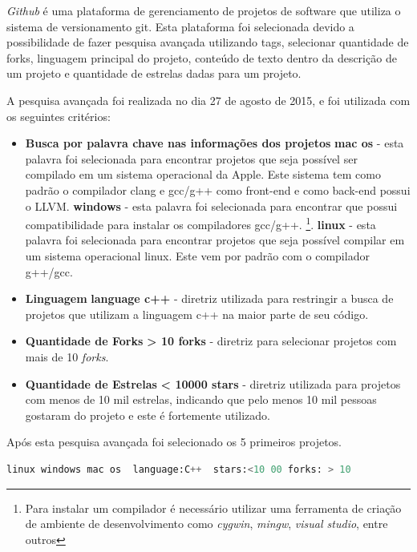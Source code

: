 \textit{Github} é uma plataforma de gerenciamento de projetos de software que
utiliza o sistema de versionamento git. Esta plataforma foi selecionada devido a
 possibilidade de fazer pesquisa avançada utilizando tags, selecionar quantidade de forks,
 linguagem principal do projeto, conteúdo de texto dentro da descrição de um projeto e
 quantidade de estrelas dadas para um projeto.


A pesquisa avançada foi realizada no dia 27 de agosto de 2015, e foi utilizada
 com os seguintes critérios:

\begin{itemize}
    \item \textbf{Busca por palavra chave nas informações dos projetos}
        \subitem \textbf{mac os} - esta palavra foi selecionada para encontrar projetos
 que seja possível ser compilado em um sistema operacional da Apple. Este sistema tem
 como padrão o compilador clang e gcc/g++ como front-end  e como back-end possui o LLVM.
        \subitem \textbf{windows} - esta palavra foi selecionada para encontrar 
 que possui compatibilidade para instalar os compiladores gcc/g++.
\footnote{Para instalar um compilador é necessário utilizar uma ferramenta de criação de ambiente de desenvolvimento como \textit{cygwin}, \textit{mingw}, \textit{visual studio}, entre outros}.
        \subitem \textbf{linux} - esta palavra foi selecionada para encontrar projetos
 que seja possível compilar em um sistema operacional linux. Este vem por padrão com
 o compilador g++/gcc.
    \item \textbf{Linguagem}
        \subitem \textbf{language c++} - diretriz utilizada para restringir a busca de 
projetos que utilizam a linguagem c++ na maior parte de seu código.
    \item \textbf{Quantidade de Forks}
        \subitem \textbf{ > 10 forks} - diretriz para selecionar projetos com
 mais de 10 \textit{forks}.
    \item \textbf{Quantidade de Estrelas}
        \subitem \textbf{ < 10000 stars } - diretriz utilizada para projetos com menos
 de 10 mil estrelas, indicando que pelo menos 10 mil pessoas gostaram do projeto e este
é fortemente utilizado. 
\end{itemize}

Após esta pesquisa avançada foi selecionado os 5 primeiros projetos.


\begin{lstlisting}[language=python, caption={Busca avançada github },
                  label=busca_avanacada_github]
     linux windows mac os  language:C++  stars:<10 00 forks: > 10
\end{lstlisting}


